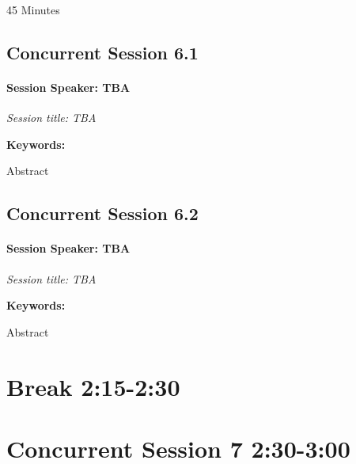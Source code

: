 \documentclass[
]{book}
\begin{document}
45 Minutes

\hypertarget{concurrent-session-6.1}{%
\subsection*{Concurrent Session 6.1}\label{concurrent-session-6.1}}

\begin{speaker}
\hypertarget{session-speaker-tba}{%
\paragraph{\texorpdfstring{Session Speaker:
\textbf{TBA}}{Session Speaker: TBA}}\label{session-speaker-tba}}

\emph{Session title: TBA}

\textbf{Keywords:}

Abstract
\end{speaker}

\hypertarget{concurrent-session-6.2}{%
\subsection*{Concurrent Session 6.2}\label{concurrent-session-6.2}}

\begin{speaker}
\hypertarget{session-speaker-tba}{%
\paragraph{\texorpdfstring{Session Speaker:
\textbf{TBA}}{Session Speaker: TBA}}\label{session-speaker-tba}}

\emph{Session title: TBA}

\textbf{Keywords:}

Abstract
\end{speaker}

\hypertarget{break-215-230}{%
\section*{Break \textbar{} 2:15-2:30}\label{break-215-230}}

\hypertarget{concurrent-session-7-230-300}{%
\section*{Concurrent Session 7 \textbar{} 2:30-3:00}\label{concurrent-session-7-230-300}}
\end{document}
